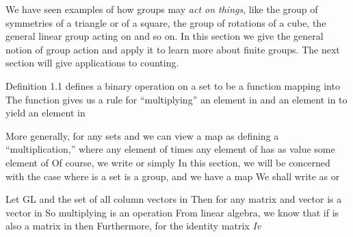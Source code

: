 \documentclass[11pt,oneside]{article}
\begin{document}
\fi
\renewcommand{\BookFooter}{Section 14 Group Action on a Set}
\ifdefined\BookMaster\else\setcounter{page}{132}\fi
\BookNarrativetrue

\begin{BookBody}


\noindent We have seen examples of how groups may\textit{ act on things}, like the group of symmetries of a triangle or of a square, the group of rotations of a cube, the general linear group acting on  and so on. In this section we give the general notion of group action and apply it to learn more about finite groups. The next section will give applications to counting.


\noindent Definition 1.1 defines a binary operation \BookInline{\ast } on a set  to be a function mapping  into  The function \BookInline{\ast } gives us a rule for “multiplying” an element  in  and an element  in  to yield an element  in 

More generally, for any sets  and  we can view a map  as defining a “multiplication,” where any element  of  times any element  of  has as value some element  of  Of course, we write  or simply  In this section, we will be concerned with the case where  is a set is a group, and we have a map  We shall write  as  or 

 Let  GL and  the set of all column vectors in  Then for any matrix  and vector  is a vector in  So multiplying is an operation  From linear algebra, we know that if  is also a matrix in  then  Furthermore, for the identity matrix  \textit{Iv} \BookEnd{\blacktriangle}


\end{BookBody}
\end{document}
